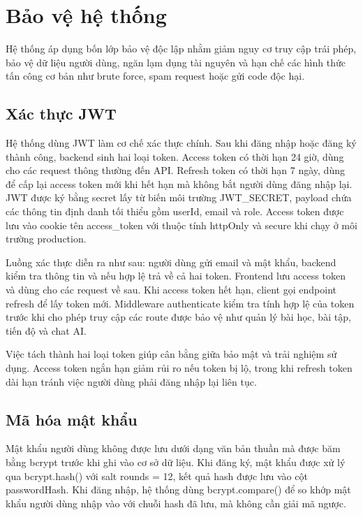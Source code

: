 \documentclass[../main.tex]{subfiles}
\begin{document}
\section{Bảo vệ hệ thống}

Hệ thống áp dụng bốn lớp bảo vệ độc lập nhằm giảm nguy cơ truy cập trái phép, bảo vệ dữ liệu người dùng, ngăn lạm dụng tài nguyên và hạn chế các hình thức tấn công cơ bản như brute force, spam request hoặc gửi code độc hại.

\subsection{Xác thực JWT}

Hệ thống dùng JWT làm cơ chế xác thực chính. Sau khi đăng nhập hoặc đăng ký thành công, backend sinh hai loại token. Access token có thời hạn 24 giờ, dùng cho các request thông thường đến API. Refresh token có thời hạn 7 ngày, dùng để cấp lại access token mới khi hết hạn mà không bắt người dùng đăng nhập lại. JWT được ký bằng secret lấy từ biến môi trường JWT\_SECRET, payload chứa các thông tin định danh tối thiểu gồm userId, email và role. Access token được lưu vào cookie tên access\_token với thuộc tính httpOnly và secure khi chạy ở môi trường production.

Luồng xác thực diễn ra như sau: người dùng gửi email và mật khẩu, backend kiểm tra thông tin và nếu hợp lệ trả về cả hai token. Frontend lưu access token và dùng cho các request về sau. Khi access token hết hạn, client gọi endpoint refresh để lấy token mới. Middleware authenticate kiểm tra tính hợp lệ của token trước khi cho phép truy cập các route được bảo vệ như quản lý bài học, bài tập, tiến độ và chat AI.

Việc tách thành hai loại token giúp cân bằng giữa bảo mật và trải nghiệm sử dụng. Access token ngắn hạn giảm rủi ro nếu token bị lộ, trong khi refresh token dài hạn tránh việc người dùng phải đăng nhập lại liên tục.

\subsection{Mã hóa mật khẩu}

Mật khẩu người dùng không được lưu dưới dạng văn bản thuần mà được băm bằng bcrypt trước khi ghi vào cơ sở dữ liệu. Khi đăng ký, mật khẩu được xử lý qua bcrypt.hash() với salt rounds = 12, kết quả hash được lưu vào cột passwordHash. Khi đăng nhập, hệ thống dùng bcrypt.compare() để so khớp mật khẩu người dùng nhập vào với chuỗi hash đã lưu, mà không cần giải mã ngược.
\end{document}
